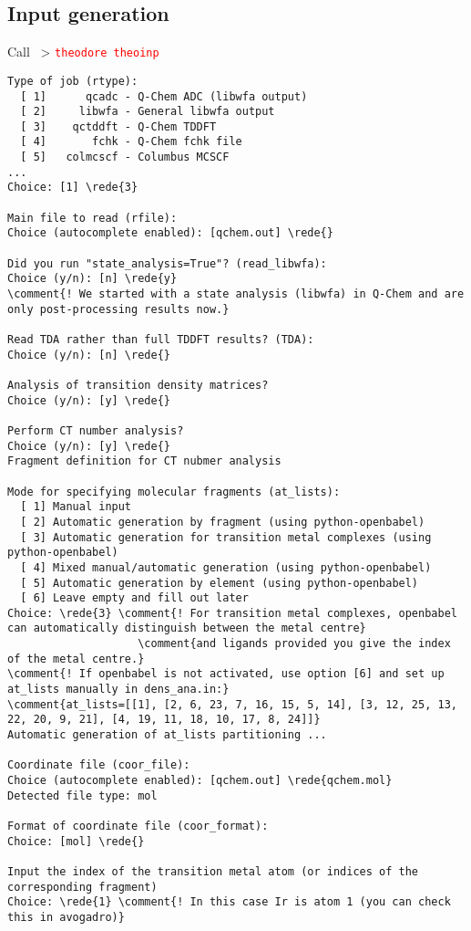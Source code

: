 \documentclass[DIV=12,headings=normal]{scrartcl}
\newcommand{\comment}[1]{\textcolor{blue}{#1}}
\newcommand{\redl}[1]{{\textcolor{red}{\texttt{#1}}}}
\newcommand{\rede}[1]{\redl{#1 <ENTER>}}
\newcommand{\comm}[1]{
\small
~> \redl{#1}
\normalsize
}
\newcounter{number}
\begin{document}
\subsection{Input generation}
Call \comm{theodore theoinp}
\scriptsize
\begin{Verbatim}[commandchars=\\\{\}]
Type of job (rtype):
  [ 1]      qcadc - Q-Chem ADC (libwfa output)
  [ 2]     libwfa - General libwfa output
  [ 3]    qctddft - Q-Chem TDDFT
  [ 4]       fchk - Q-Chem fchk file
  [ 5]   colmcscf - Columbus MCSCF
...
Choice: [1] \rede{3}

Main file to read (rfile):
Choice (autocomplete enabled): [qchem.out] \rede{}

Did you run "state_analysis=True"? (read_libwfa):
Choice (y/n): [n] \rede{y}
\comment{! We started with a state analysis (libwfa) in Q-Chem and are only post-processing results now.}

Read TDA rather than full TDDFT results? (TDA):
Choice (y/n): [n] \rede{}

Analysis of transition density matrices?
Choice (y/n): [y] \rede{}

Perform CT number analysis?
Choice (y/n): [y] \rede{}
Fragment definition for CT nubmer analysis

Mode for specifying molecular fragments (at_lists):
  [ 1] Manual input
  [ 2] Automatic generation by fragment (using python-openbabel)
  [ 3] Automatic generation for transition metal complexes (using python-openbabel)
  [ 4] Mixed manual/automatic generation (using python-openbabel)
  [ 5] Automatic generation by element (using python-openbabel)
  [ 6] Leave empty and fill out later
Choice: \rede{3} \comment{! For transition metal complexes, openbabel can automatically distinguish between the metal centre} 
                    \comment{and ligands provided you give the index of the metal centre.}
\comment{! If openbabel is not activated, use option [6] and set up at_lists manually in dens_ana.in:}
\comment{at_lists=[[1], [2, 6, 23, 7, 16, 15, 5, 14], [3, 12, 25, 13, 22, 20, 9, 21], [4, 19, 11, 18, 10, 17, 8, 24]]}
Automatic generation of at_lists partitioning ...

Coordinate file (coor_file):
Choice (autocomplete enabled): [qchem.out] \rede{qchem.mol}
Detected file type: mol

Format of coordinate file (coor_format):
Choice: [mol] \rede{}

Input the index of the transition metal atom (or indices of the corresponding fragment)
Choice: \rede{1} \comment{! In this case Ir is atom 1 (you can check this in avogadro)}


\end{Verbatim}
\end{document}
